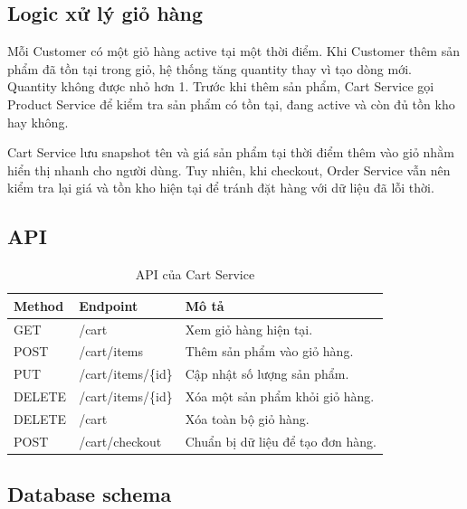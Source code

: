 \documentclass[../main.tex]{subfiles}
\begin{document}
\subsection{Logic xử lý giỏ hàng}
\label{subsection:2.5.2}

Mỗi Customer có một giỏ hàng active tại một thời điểm. Khi Customer thêm sản phẩm đã tồn tại trong giỏ, hệ thống tăng quantity thay vì tạo dòng mới. Quantity không được nhỏ hơn 1. Trước khi thêm sản phẩm, Cart Service gọi Product Service để kiểm tra sản phẩm có tồn tại, đang active và còn đủ tồn kho hay không.

Cart Service lưu snapshot tên và giá sản phẩm tại thời điểm thêm vào giỏ nhằm hiển thị nhanh cho người dùng. Tuy nhiên, khi checkout, Order Service vẫn nên kiểm tra lại giá và tồn kho hiện tại để tránh đặt hàng với dữ liệu đã lỗi thời.

\subsection{API}
\label{subsection:2.5.3}

\begin{table}[H]
    \centering
    \caption{API của Cart Service}
    \label{tab:chapter2-cart-api}
    \begin{tabular}{|p{}|p{}|p{}|}
        \hline
        \rowcolor{primary!35}
        \textbf{Method} & \textbf{Endpoint} & \textbf{Mô tả} \\
        \hline
        GET & /cart & Xem giỏ hàng hiện tại. \\
        \hline
        POST & /cart/items & Thêm sản phẩm vào giỏ hàng. \\
        \hline
        PUT & /cart/items/\{id\} & Cập nhật số lượng sản phẩm. \\
        \hline
        DELETE & /cart/items/\{id\} & Xóa một sản phẩm khỏi giỏ hàng. \\
        \hline
        DELETE & /cart & Xóa toàn bộ giỏ hàng. \\
        \hline
        POST & /cart/checkout & Chuẩn bị dữ liệu để tạo đơn hàng. \\
        \hline
    \end{tabular}
\end{table}

\subsection{Database schema}
\label{subsection:2.5.4}
\end{document}

